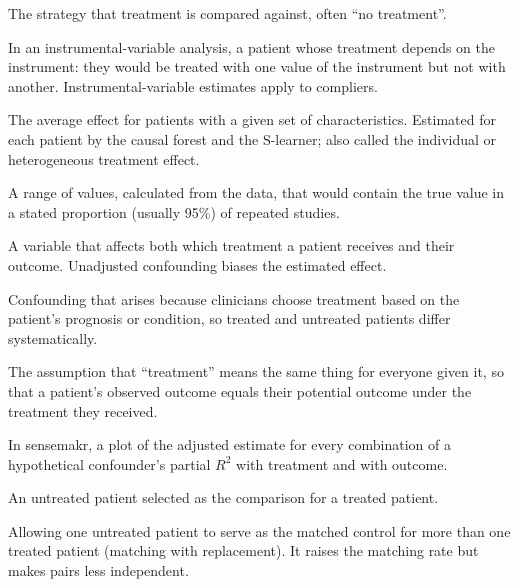 \begin{description}[style=nextline, leftmargin=1.2em, itemsep=3pt, font=\normalfont\bfseries]
\item[Comparator]
The strategy that treatment is compared against, often ``no treatment''.

\item[Complier]
In an instrumental-variable analysis, a patient whose treatment depends on the instrument: they would be treated with one value of the instrument but not with another. Instrumental-variable estimates apply to compliers.

\item[Conditional average treatment effect (CATE)]\label{gl:cate}
The average effect for patients with a given set of characteristics. Estimated for each patient by the causal forest and the S-learner; also called the individual or heterogeneous treatment effect.

\item[Confidence interval (CI)]\label{gl:ci}
A range of values, calculated from the data, that would contain the true value in a stated proportion (usually 95\%) of repeated studies.

\item[Confounder]
A variable that affects both which treatment a patient receives and their outcome. Unadjusted confounding biases the estimated effect.

\item[Confounding by indication]
Confounding that arises because clinicians choose treatment based on the patient's prognosis or condition, so treated and untreated patients differ systematically.

\item[Consistency]
The assumption that ``treatment'' means the same thing for everyone given it, so that a patient's observed outcome equals their potential outcome under the treatment they received.

\item[Contour plot (sensitivity)]
In sensemakr, a plot of the adjusted estimate for every combination of a hypothetical confounder's partial $R^2$ with treatment and with outcome.

\item[Control (matched control)]
An untreated patient selected as the comparison for a treated patient.

\item[Control reuse]
Allowing one untreated patient to serve as the matched control for more than one treated patient (matching with replacement). It raises the matching rate but makes pairs less independent.


\end{description}
